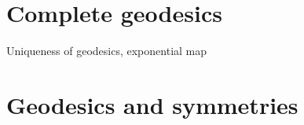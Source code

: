 \section{Complete geodesics}

Uniqueness of geodesics, exponential map




\section{Geodesics and symmetries}


